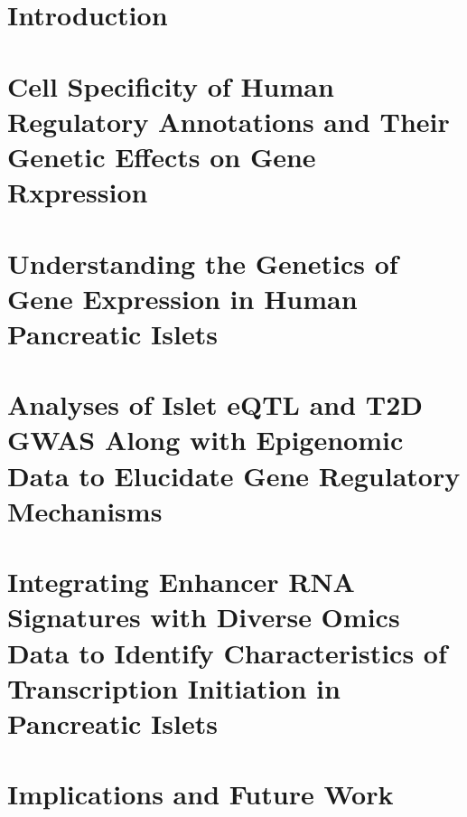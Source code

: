 \documentclass[reqno,12pt,oneside]{report} %
\theoremstyle{plain}
\theoremstyle{definition}
\theoremstyle{remark}
\numberwithin{theorem}{chapter}     %
\begin{document}
\chapter{Introduction}
\label{chap:intro}



\chapter{Cell Specificity of Human Regulatory Annotations and Their Genetic Effects on Gene Rxpression}
\label{chap:2_regulatory_elements}



\chapter{Understanding the Genetics of Gene Expression in Human Pancreatic Islets}
\label{chap:3_islet_eqtl}



\chapter{Analyses of Islet eQTL and T2D GWAS Along with Epigenomic Data to Elucidate Gene Regulatory Mechanisms}
\label{chap:4_inspire}



\chapter{Integrating Enhancer RNA Signatures with Diverse Omics Data to Identify Characteristics of Transcription Initiation in Pancreatic Islets}
\label{chap:cc}



\chapter{Implications and Future Work}
\label{chap:conclusion}

 

%
%
%
 
\startbibliography
 \begin{singlespace} %
% 

 
 \end{singlespace}

%
\end{document}
